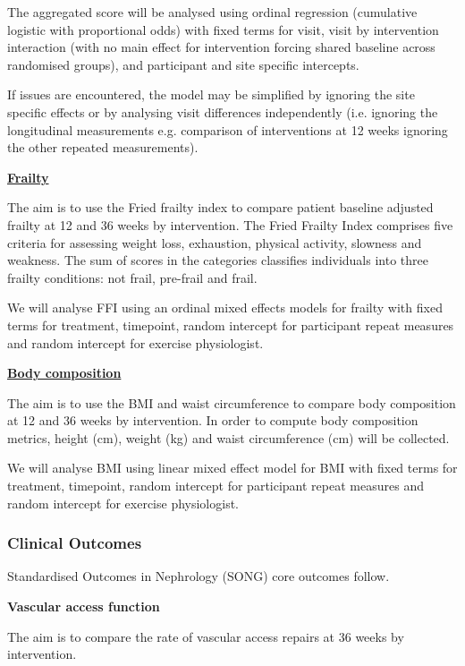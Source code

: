 \documentclass[11pt,parskip=half-]{scrartcl}
\begin{document}
The aggregated score will be analysed using ordinal regression (cumulative logistic with proportional odds)  with fixed terms for visit, visit by intervention interaction (with no main effect for intervention forcing shared baseline across randomised groups), and participant and site specific  intercepts.

If issues are encountered, the model may be simplified by ignoring the site specific effects or by analysing visit differences independently (i.e. ignoring the longitudinal measurements e.g. comparison of interventions at 12 weeks ignoring the other repeated measurements).

\label{analysis:ffi}
\hyperref[outcome:ffi]{\textbf{Frailty}}

The aim is to use the Fried frailty index to compare patient baseline adjusted frailty at 12 and 36 weeks by intervention. The Fried Frailty Index comprises five criteria for assessing weight loss, exhaustion, physical activity, slowness and weakness. The sum of scores in the categories classifies individuals into three frailty conditions: not frail, pre-frail and frail.

We will analyse FFI using an ordinal mixed effects models for frailty with fixed terms for treatment, timepoint, random intercept for participant repeat measures and random intercept for exercise physiologist.

\label{analysis:body}
\hyperref[outcome:body]{\textbf{Body composition}}

The aim is to use the BMI and waist circumference to compare body composition at 12 and 36 weeks by intervention. In order to compute body composition metrics, height (cm), weight (kg) and waist circumference (cm) will be collected.

We will analyse BMI using linear mixed effect model for BMI with fixed terms for treatment, timepoint, random intercept for participant repeat measures and random intercept for exercise physiologist.

\subsubsection{Clinical Outcomes}\label{clinical-outcomes}

Standardised Outcomes in Nephrology (SONG) core outcomes follow.

\textbf{Vascular access function}

The aim is to compare the rate of vascular access repairs at 36 weeks by intervention.
\end{document}
